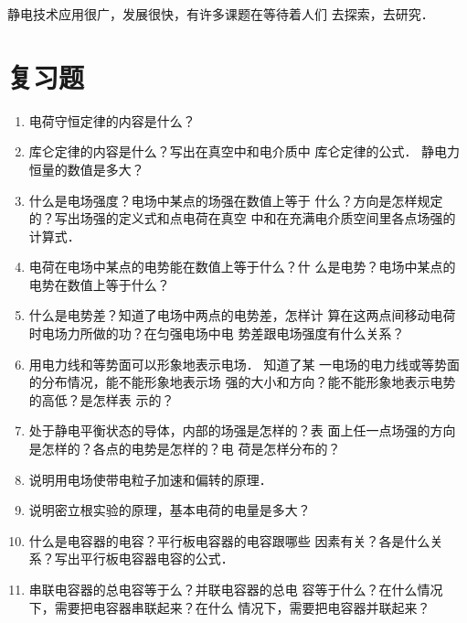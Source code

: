 静电技术应用很广，发展很快，有许多课题在等待着人们
去探索，去研究．

\section*{复习题}
\begin{enumerate}
\item 电荷守恒定律的内容是什么？
\item 库仑定律的内容是什么？写出在真空中和电介质中
库仑定律的公式．
静电力恒量的数值是多大？
\item 什么是电场强度？电场中某点的场强在数值上等于
什么？方向是怎样规定的？写出场强的定义式和点电荷在真空
中和在充满电介质空间里各点场强的计算式．
\item 电荷在电场中某点的电势能在数值上等于什么？什
么是电势？电场中某点的电势在数值上等于什么？
\item 什么是电势差？知道了电场中两点的电势差，怎样计
算在这两点间移动电荷时电场力所做的功？在匀强电场中电
势差跟电场强度有什么关系？
\item 用电力线和等势面可以形象地表示电场．
知道了某
一电场的电力线或等势面的分布情况，能不能形象地表示场
强的大小和方向？能不能形象地表示电势的高低？是怎样表
示的？
\item 处于静电平衡状态的导体，内部的场强是怎样的？表
面上任一点场强的方向是怎样的？各点的电势是怎样的？电
荷是怎样分布的？
\item 说明用电场使带电粒子加速和偏转的原理．
\item 说明密立根实验的原理，基本电荷的电量是多大？
\item 什么是电容器的电容？平行板电容器的电容跟哪些
因素有关？各是什么关系？写出平行板电容器电容的公式．
\item 串联电容器的总电容等于么？并联电容器的总电
容等于什么？在什么情况下，需要把电容器串联起来？在什么
情况下，需要把电容器并联起来？
\end{enumerate}

